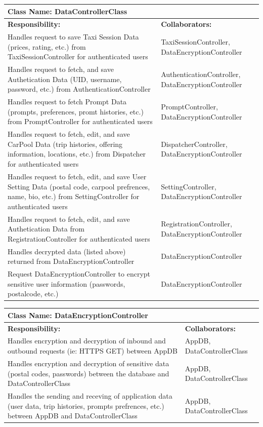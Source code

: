 \documentclass[]{article}
\begin{document}
\begin{table}[H]
	\centering
	\begin{tabular}{|p{6cm}|p{6cm}|}
	\hline 
		\multicolumn{2}{|l|}{\textbf{Class Name: DataControllerClass}} \\
	\hline
	\textbf{Responsibility:} & \textbf{Collaborators:} \\
	\hline 
	Handles request to save Taxi Session Data (prices, rating, etc.) from TaxiSessionController for authenticated users & TaxiSessionController, DataEncryptionController\\ \hline 
	Handles request to fetch, and save Authetication Data (UID, username, password, etc.) from AuthenticationController &AuthenticationController, DataEncryptionController\\ \hline 
	Handles request to fetch Prompt Data (prompts, preferences, promt histories, etc.) from PromptController for authenticated users &PromptController, DataEncryptionController\\ \hline 
	Handles request to fetch, edit, and save CarPool Data (trip histories, offering information, locations, etc.) from Dispatcher for authenticated users &DispatcherController, DataEncryptionController\\ \hline 
	Handles request to fetch, edit, and save User Setting Data (postal code, carpool prefrences, name, bio, etc.) from SettingController for authenticated users&SettingController, DataEncryptionController\\ \hline 
	Handles request to fetch, edit, and save Authetication Data from RegistrationController for authenticated users &RegistrationController, DataEncryptionController\\ \hline 
	Handles decrypted data (listed above) returned from DataEncryptionController & DataEncryptionController\\ \hline 
	Request DataEncryptionController to encrypt sensitive user information (passwords, postalcode, etc.) & DataEncryptionController\\ \hline 
	\end{tabular}
	\end{table}

	\begin{table}[H]
	\centering
	\begin{tabular}{|p{6cm}|p{6cm}|}
	\hline 
		\multicolumn{2}{|l|}{\textbf{Class Name: DataEncryptionController}} \\
	\hline
	\textbf{Responsibility:} & \textbf{Collaborators:} \\
	\hline
	Handles encryption and decryption of inbound and outbound requests (ie: HTTPS GET) between AppDB& AppDB, DataControllerClass\\ \hline
	Handles encryption and decryption of sensitive data (postal codes, passwords) between the database and DataControllerClass& AppDB, DataControllerClass\\ \hline
	Handles the sending and receving of application data (user data, trip histories, prompts prefrences, etc.) between AppDB and DataControllerClass & AppDB, DataControllerClass\\ \hline
	\end{tabular}
	\end{table}
\end{document}
